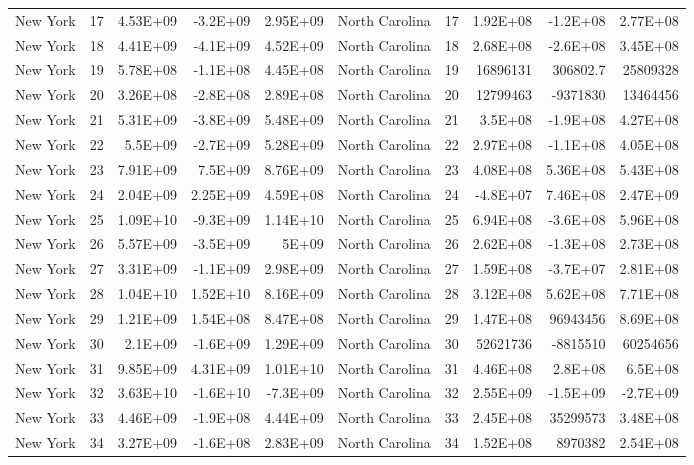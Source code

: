 \begin{table}[]
\begin{tabular}{lrrrrlrrrr}
		New York &  17 & 4.53E+09 & -3.2E+09 & 2.95E+09 & North Carolina &  17 & 1.92E+08 & -1.2E+08 & 2.77E+08 \\
		New York &  18 & 4.41E+09 & -4.1E+09 & 4.52E+09 & North Carolina &  18 & 2.68E+08 & -2.6E+08 & 3.45E+08 \\
		New York &  19 & 5.78E+08 & -1.1E+08 & 4.45E+08 & North Carolina &  19 & 16896131 & 306802.7 & 25809328 \\
		New York &  20 & 3.26E+08 & -2.8E+08 & 2.89E+08 & North Carolina &  20 & 12799463 & -9371830 & 13464456 \\
		New York &  21 & 5.31E+09 & -3.8E+09 & 5.48E+09 & North Carolina &  21 & 3.5E+08 & -1.9E+08 & 4.27E+08 \\
		New York &  22 & 5.5E+09 & -2.7E+09 & 5.28E+09 & North Carolina &  22 & 2.97E+08 & -1.1E+08 & 4.05E+08 \\
		New York &  23 & 7.91E+09 & 7.5E+09 & 8.76E+09 & North Carolina &  23 & 4.08E+08 & 5.36E+08 & 5.43E+08 \\
		New York &  24 & 2.04E+09 & 2.25E+09 & 4.59E+08 & North Carolina &  24 & -4.8E+07 & 7.46E+08 & 2.47E+09 \\
		New York &  25 & 1.09E+10 & -9.3E+09 & 1.14E+10 & North Carolina &  25 & 6.94E+08 & -3.6E+08 & 5.96E+08 \\
		New York &  26 & 5.57E+09 & -3.5E+09 & 5E+09 & North Carolina &  26 & 2.62E+08 & -1.3E+08 & 2.73E+08 \\
		New York &  27 & 3.31E+09 & -1.1E+09 & 2.98E+09 & North Carolina &  27 & 1.59E+08 & -3.7E+07 & 2.81E+08 \\
		New York &  28 & 1.04E+10 & 1.52E+10 & 8.16E+09 & North Carolina &  28 & 3.12E+08 & 5.62E+08 & 7.71E+08 \\
		New York &  29 & 1.21E+09 & 1.54E+08 & 8.47E+08 & North Carolina &  29 & 1.47E+08 & 96943456 & 8.69E+08 \\
		New York &  30 & 2.1E+09 & -1.6E+09 & 1.29E+09 & North Carolina &  30 & 52621736 & -8815510 & 60254656 \\
		New York &  31 & 9.85E+09 & 4.31E+09 & 1.01E+10 & North Carolina &  31 & 4.46E+08 & 2.8E+08 & 6.5E+08 \\
		New York &  32 & 3.63E+10 & -1.6E+10 & -7.3E+09 & North Carolina &  32 & 2.55E+09 & -1.5E+09 & -2.7E+09 \\
		New York &  33 & 4.46E+09 & -1.9E+08 & 4.44E+09 & North Carolina &  33 & 2.45E+08 & 35299573 & 3.48E+08 \\
		New York &  34 & 3.27E+09 & -1.6E+08 & 2.83E+09 & North Carolina &  34 & 1.52E+08 & 8970382 & 2.54E+08
	\end{tabular}
\end{table}

